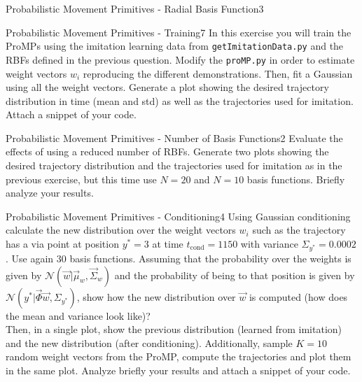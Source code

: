 \begin{questions}
\begin{question}[bonus]{Probabilistic Movement Primitives - Radial Basis Function}{3}
\begin{answer}\end{answer}
\end{question}


\begin{question}[bonus]{Probabilistic Movement Primitives - Training}{7}
In this exercise you will train the ProMPs using the imitation learning data from \texttt{getImitationData.py} and the RBFs defined in the previous question. Modify the \texttt{proMP.py} in order to estimate weight vectors $w_i$ reproducing the different demonstrations. Then, fit a Gaussian using all the weight vectors. Generate a plot showing the desired trajectory distribution in time (mean and std) as well as the trajectories used for imitation. Attach a snippet of your code.

\begin{answer}\end{answer}

\end{question}


\begin{question}[bonus]{Probabilistic Movement Primitives - Number of Basis Functions}{2}
Evaluate the effects of using a reduced number of RBFs. Generate two plots showing the desired trajectory distribution and the trajectories used for imitation as in the previous exercise, but this time use $N=20$ and $N=10$ basis functions. Briefly analyze your results.

\begin{answer}\end{answer}

\end{question}



\begin{question}[bonus]{Probabilistic Movement Primitives - Conditioning}{4}
Using Gaussian conditioning calculate the new distribution over the weight vectors $w_i$ such as the trajectory has a via point at position $y^*=3$ at time $t_\textrm{cond}=1150$ with variance $\Sigma_{y^*}=0.0002$. Use again 30 basis functions.
Assuming that the probability over the weights is given by $\mathcal{N}(\vec w|\vec \mu_w,\vec \Sigma_w)$ and the probability of being to that position is given by $\mathcal{N}(y^*|\vec \Phi \vec w, \Sigma_{y^*} )$, show how the new distribution over $\vec w$ is computed (how does the mean and variance look like)?
\\
Then, in a single plot, show the previous distribution (learned from imitation) and the new distribution (after conditioning). Additionally, sample $K=10$ random weight vectors from the ProMP, compute the trajectories and plot them in the same plot. Analyze briefly your results and attach a snippet of your code.


\end{question}
\end{questions}
